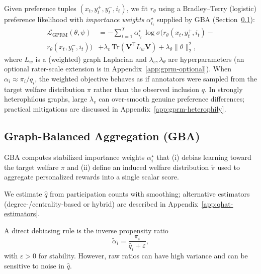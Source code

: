 \documentclass{article}
\theoremstyle{plain}
\theoremstyle{definition}
\theoremstyle{remark}
\begin{document}
Given preference tuples $(x_t,y_t^+,y_t^-,i_t)$, we fit $r_\theta$ using a
Bradley--Terry (logistic) preference likelihood with \emph{importance weights}
$\alpha_{i_t}^\star$ supplied by GBA (Section~\ref{subsec:gba}):
\begin{align}
    \mathcal{L}_{\text{GPRM}}(\theta,\psi)
    &=
    - \sum_{t=1}^T
    \alpha_{i_t}^\star\,
    \log \sigma\!\Big(
        r_\theta(x_t,y_t^+,i_t)- \nonumber \\ r_\theta(x_t,y_t^-,i_t)
    \Big)
    &
    + \lambda_v\, \mathrm{Tr}(\mathbf{V}^\top L_w \mathbf{V})
    + \lambda_\theta\|\theta\|_2^2,
    \label{eq:gprm-loss}
\end{align}
where $L_w$ is a (weighted) graph Laplacian and $\lambda_v,\lambda_\theta$
are hyperparameters (an optional rater-scale extension is in Appendix~\ref{app:gprm-optional}). When $\alpha_i \approx \pi_i/q_i$, the weighted objective
behaves as if annotators were sampled from the target welfare distribution
$\pi$ rather than the observed inclusion $q$. In strongly heterophilous graphs, large $\lambda_v$ can over-smooth genuine preference differences; practical mitigations are discussed in Appendix~\ref{app:gprm-heterophily}.

\subsection{Graph-Balanced Aggregation (GBA)}
\label{subsec:gba}

GBA computes stabilized importance weights $\alpha_i^\star$ that (i) debias learning
toward the target welfare $\pi$ and (ii) define an induced welfare distribution
$\tilde\pi$ used to aggregate personalized rewards into a single scalar score.

We estimate $\hat q$ from participation counts with smoothing; alternative estimators
(degree-/centrality-based or hybrid) are described in Appendix~\ref{app:qhat-estimators}.

A direct debiasing rule is the inverse propensity ratio
\begin{equation}
    \tilde\alpha_i = \frac{\pi_i}{\hat q_i + \varepsilon},
    \label{eq:alpha-raw}
\end{equation}
with $\varepsilon>0$ for stability. However, raw ratios can have high variance
and can be sensitive to noise in $\hat q$.
\end{document}
